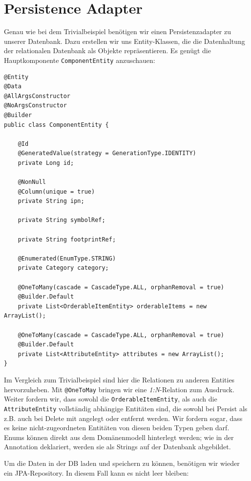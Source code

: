\section{Persistence Adapter}
Genau wie bei dem Trivialbeispiel benötigen wir einen Persistenzadapter zu
unserer Datenbank. Dazu erstellen wir uns Entity-Klassen, die die Datenhaltung
der relationalen Datenbank als Objekte repräsentieren. Es genügt die
Hauptkomponente \texttt{ComponentEntity} anzuschauen:

\begin{listing}[H]
\begin{verbatim}
@Entity
@Data
@AllArgsConstructor
@NoArgsConstructor
@Builder
public class ComponentEntity {
    
    @Id
    @GeneratedValue(strategy = GenerationType.IDENTITY)
    private Long id;

    @NonNull
    @Column(unique = true)
    private String ipn;

    private String symbolRef;
    
    private String footprintRef;
   
    @Enumerated(EnumType.STRING)
    private Category category;

    @OneToMany(cascade = CascadeType.ALL, orphanRemoval = true)
    @Builder.Default
    private List<OrderableItemEntity> orderableItems = new ArrayList();

    @OneToMany(cascade = CascadeType.ALL, orphanRemoval = true)
    @Builder.Default
    private List<AttributeEntity> attributes = new ArrayList();
}
\end{verbatim}
\caption{Component Entity}
\label{lst:componentEntity}
\end{listing}

Im Vergleich zum Trivialbeispiel sind hier die Relationen zu anderen
Entities hervorzuheben. Mit \texttt{@OneToMay} bringen wir eine 
\textit{1:N}-Relation zum Ausdruck. Weiter fordern wir, dass 
sowohl die \texttt{OrderableItemEntity}, als auch die 
\texttt{AttributeEntity} vollständig abhängige Entitäten sind,
die sowohl bei Persist als z.B. auch bei Delete mit angelegt oder
entfernt werden. Wir fordern sogar, dass es keine nicht-zugeordneten
Entitäten von diesen beiden Typen geben darf. Enums können direkt
aus dem Domänenmodell hinterlegt werden; wie in der Annotation
deklariert, werden sie als Strings auf der Datenbank abgebildet.

Um die Daten in der DB laden und speichern zu können, benötigen wir 
wieder ein JPA-Repository. In diesem Fall kann es nicht leer bleiben:


